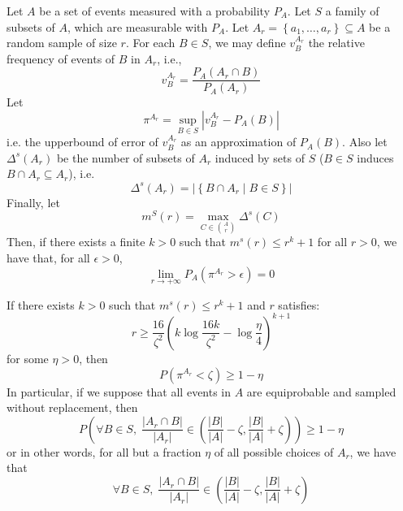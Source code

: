     \lemma[Fact 5.10]\label{fact_5.10}
        Let $A$ be a set of events measured with a probability $P_A$.
        Let $S$ a family of subsets of $A$, which are measurable with $P_A$.
        Let $A_r = \left\{ a_1, \dots, a_r \right\} \subseteq A$ be a random sample of size $r$.
        For each $B \in S$, we may define $v_B^{A_r}$ the relative frequency of events of $B$ in $A_r$, i.e.,
        $$
            v_B^{A_r} = \frac{P_A(A_r \cap B)}{P_A(A_r)}
        $$
        Let
        $$
            \pi ^{A_r} = \sup_{B \in S} \left| v_B^{A_r} - P_A(B) \right|
        $$
        i.e. the upperbound of error of $v_B^{A_r}$ as an approximation of $P_A(B)$.
        Also let $\Delta^s(A_r)$ be the number of subsets of $A_r$ induced by sets of $S$ ($B\in S$ induces
        $B \cap A_r \subseteq A_r$), i.e.
        $$
            \Delta^s(A_r) = \left| \left\{ B \cap A_r \mid B \in S \right\} \right|
        $$
        Finally, let
        $$
            m^S(r) = \max_{C \in {A \choose r}} \Delta^s(C)
        $$
        Then, if there exists a finite $k > 0$ such that $m^s(r) \leq r^k +1$ for all $r > 0$, we have that,
        for all $\epsilon > 0$,
        $$
            \lim_{r \to +\infty} P_A\left( \pi^{A_r} > \epsilon \right) = 0
        $$

    \begin{remark}[Fact 5.12]\label{fact_5.12}
        If there exists $k > 0$ such that $m^s(r) \leq r^k + 1$ and $r$ satisfies:
        $$
            r \geq \frac{16}{\zeta^2} \left( k \log \frac{16 k}{\zeta^2} - \log \frac{\eta}{4} \right)^{k+1}
        $$
        for some $\eta > 0$, then
        $$
            P\left( \pi^{A_r} < \zeta \right) \geq 1 - \eta
        $$
        In particular, if we suppose that all events in $A$ are equiprobable and sampled without replacement, then
        $$
            P\left( \forall B \in S, \; \frac{\left| A_r \cap B \right|}{\left| A_r \right|} \in
                 \left( \frac{\left| B \right|}{\left| A \right|} -
                 \zeta, \frac{\left| B \right|}{\left| A \right|} + \zeta \right) \right) \geq 1 - \eta
        $$
        or in other words, for all but a fraction $\eta$ of all possible choices of $A_r$, we have that
        $$
            \forall B \in S, \; \frac{\left| A_r \cap B \right|}{\left| A_r \right|} \in
                 \left( \frac{\left| B \right|}{\left| A \right|} -
                 \zeta, \frac{\left| B \right|}{\left| A \right|} + \zeta \right)
        $$
    \end{remark}


